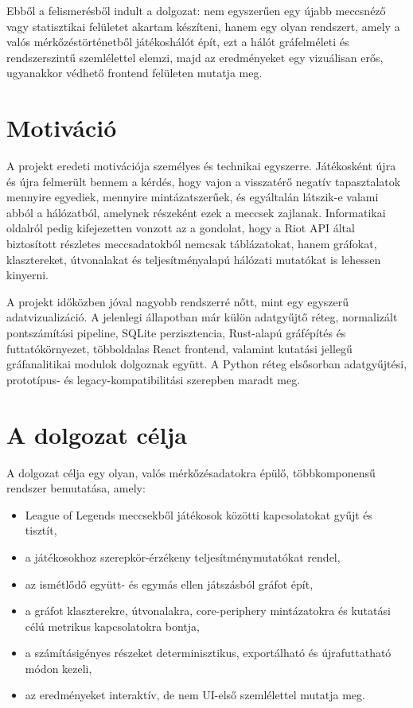 ﻿\documentclass[a4paper,12pt]{report}
\begin{document}
Ebből a felismerésből indult a dolgozat: nem egyszerűen egy újabb meccsnéző vagy statisztikai felületet akartam készíteni, hanem egy olyan rendszert, amely a valós mérkőzéstörténetből játékoshálót épít, ezt a hálót gráfelméleti és rendszerszintű szemlélettel elemzi, majd az eredményeket egy vizuálisan erős, ugyanakkor védhető frontend felületen mutatja meg.

\section{Motiváció}

A projekt eredeti motivációja személyes és technikai egyszerre. Játékosként újra és újra felmerült bennem a kérdés, hogy vajon a visszatérő negatív tapasztalatok mennyire egyediek, mennyire mintázatszerűek, és egyáltalán látszik-e valami abból a hálózatból, amelynek részeként ezek a meccsek zajlanak. Informatikai oldalról pedig kifejezetten vonzott az a gondolat, hogy a Riot API által biztosított részletes meccsadatokból nemcsak táblázatokat, hanem gráfokat, klasztereket, útvonalakat és teljesítményalapú hálózati mutatókat is lehessen kinyerni.

A projekt időközben jóval nagyobb rendszerré nőtt, mint egy egyszerű adatvizualizáció. A jelenlegi állapotban már külön adatgyűjtő réteg, normalizált pontszámítási pipeline, SQLite perzisztencia, Rust-alapú gráfépítés és futtatókörnyezet, többoldalas React frontend, valamint kutatási jellegű gráfanalitikai modulok dolgoznak együtt. A Python réteg elsősorban adatgyűjtési, prototípus- és legacy-kompatibilitási szerepben maradt meg.

\section{A dolgozat célja}

A dolgozat célja egy olyan, valós mérkőzésadatokra épülő, többkomponensű rendszer bemutatása, amely:

\begin{itemize}
    \item League of Legends meccsekből játékosok közötti kapcsolatokat gyűjt és tisztít,
    \item a játékosokhoz szerepkör-érzékeny teljesítménymutatókat rendel,
    \item az ismétlődő együtt- és egymás ellen játszásból gráfot épít,
    \item a gráfot klaszterekre, útvonalakra, core-periphery mintázatokra és kutatási célú metrikus kapcsolatokra bontja,
    \item a számításigényes részeket determinisztikus, exportálható és újrafuttatható módon kezeli,
    \item az eredményeket interaktív, de nem UI-első szemlélettel mutatja meg.
\end{itemize}
\end{document}
